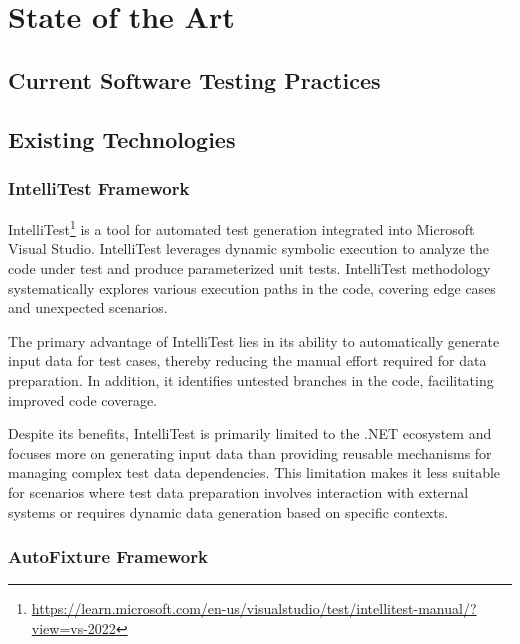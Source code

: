 
\chapter{State of the Art\label{chap:state_of_the_art}}

\todo{}

\section{Current Software Testing Practices}
\todo{}

\section{Existing Technologies}

\subsection{IntelliTest Framework}
IntelliTest\footnote{\href{https://learn.microsoft.com/en-us/visualstudio/test/intellitest-manual/?view=vs-2022}{https://learn.microsoft.com/en-us/visualstudio/test/intellitest-manual/?view=vs-2022}} is a tool for automated test generation integrated into Microsoft Visual Studio. IntelliTest leverages dynamic symbolic execution to analyze the code under test and produce parameterized unit tests. IntelliTest methodology systematically explores various execution paths in the code, covering edge cases and unexpected scenarios.

The primary advantage of IntelliTest lies in its ability to automatically generate input data for test cases, thereby reducing the manual effort required for data preparation. In addition, it identifies untested branches in the code, facilitating improved code coverage.

Despite its benefits, IntelliTest is primarily limited to the .NET ecosystem and focuses more on generating input data than providing reusable mechanisms for managing complex test data dependencies. This limitation makes it less suitable for scenarios where test data preparation involves interaction with external systems or requires dynamic data generation based on specific contexts.

\subsection{AutoFixture Framework}

